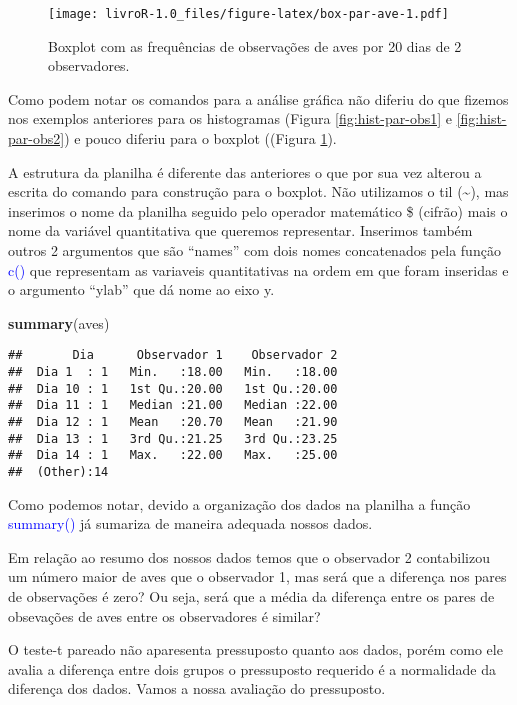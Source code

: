 \documentclass[titlepage, oneside, openany, a4paper]{book}
\newenvironment{Shaded}{\begin{snugshade}}{\end{snugshade}}
\newcommand{\KeywordTok}[1]{\textcolor[rgb]{0.13,0.29,0.53}{\textbf{#1}}}
\newcommand{\NormalTok}[1]{#1}
\begin{document}
\begin{figure}
\centering
\texttt{[image: livroR-1.0\_files/figure-latex/box-par-ave-1.pdf]}
\caption{\label{fig:box-par-ave}Boxplot com as frequências de observações de aves por 20 dias de 2 observadores.}
\end{figure}

Como podem notar os comandos para a análise gráfica não diferiu do que fizemos nos exemplos anteriores para os histogramas (Figura \ref{fig:hist-par-obs1} e \ref{fig:hist-par-obs2}) e pouco diferiu para o boxplot ((Figura \ref{fig:box-par-ave}).

A estrutura da planilha é diferente das anteriores o que por sua vez alterou a escrita do comando para construção para o boxplot. Não utilizamos o til (\textasciitilde{}), mas inserimos o nome da planilha seguido pelo operador matemático \$ (cifrão) mais o nome da variável quantitativa que queremos representar. Inserimos também outros 2 argumentos que são ``names'' com dois nomes concatenados pela função \textcolor{blue}{c()} que representam as variaveis quantitativas na ordem em que foram inseridas e o argumento ``ylab'' que dá nome ao eixo y.

\begin{Shaded}
\begin{Highlighting}[]
\KeywordTok{summary}\NormalTok{(aves)}
\end{Highlighting}
\end{Shaded}

\begin{verbatim}
##       Dia      Observador 1    Observador 2  
##  Dia 1  : 1   Min.   :18.00   Min.   :18.00  
##  Dia 10 : 1   1st Qu.:20.00   1st Qu.:20.00  
##  Dia 11 : 1   Median :21.00   Median :22.00  
##  Dia 12 : 1   Mean   :20.70   Mean   :21.90  
##  Dia 13 : 1   3rd Qu.:21.25   3rd Qu.:23.25  
##  Dia 14 : 1   Max.   :22.00   Max.   :25.00  
##  (Other):14
\end{verbatim}

Como podemos notar, devido a organização dos dados na planilha a função \textcolor{blue}{summary()} já sumariza de maneira adequada nossos dados.

Em relação ao resumo dos nossos dados temos que o observador 2 contabilizou um número maior de aves que o observador 1, mas será que a diferença nos pares de observações é zero? Ou seja, será que a média da diferença entre os pares de obsevações de aves entre os observadores é similar?

O teste-t pareado não aparesenta pressuposto quanto aos dados, porém como ele avalia a diferença entre dois grupos o pressuposto requerido é a normalidade da diferença dos dados. Vamos a nossa avaliação do pressuposto.
\end{document}
